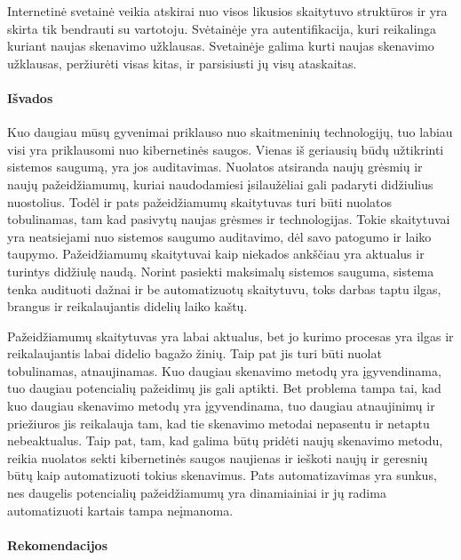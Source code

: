 Internetinė svetainė veikia atskirai nuo visos likusios skaitytuvo struktūros ir yra skirta tik bendrauti su vartotoju. Svėtainėje yra autentifikacija, kuri reikalinga kuriant naujas skenavimo užklausas. Svetainėje galima kurti naujas skenavimo užklausas, peržiurėti visas kitas, ir parsisiusti jų visų ataskaitas. 

\paragraph{Išvados}

Kuo daugiau mūsų gyvenimai priklauso nuo skaitmeninių technologijų, tuo labiau visi yra priklausomi nuo kibernetinės saugos. Vienas iš geriausių būdų užtikrinti sistemos saugumą, yra jos auditavimas. Nuolatos atsiranda naujų grėsmių ir naujų pažeidžiamumų, kuriai naudodamiesi įsilaužėliai gali padaryti didžiulius nuostolius. Todėl ir pats pažeidžiamumų skaitytuvas turi būti nuolatos tobulinamas, tam kad pasivytų naujas grėsmes ir technologijas. Tokie skaitytuvai yra neatsiejami nuo sistemos saugumo auditavimo, dėl savo patogumo ir laiko taupymo. Pažeidžiamumų skaitytuvai kaip niekados ankščiau yra aktualus ir turintys didžiulę naudą. Norint pasiekti maksimalų sistemos sauguma, sistema tenka audituoti dažnai ir be automatizuotų skaitytuvu, toks darbas taptu ilgas, brangus ir reikalaujantis didelių laiko kaštų.

Pažeidžiamumų skaitytuvas yra labai aktualus, bet jo kurimo procesas yra ilgas ir reikalaujantis labai didelio bagažo žinių. Taip pat jis turi būti nuolat tobulinamas, atnaujinamas. Kuo daugiau skenavimo metodų yra įgyvendinama, tuo daugiau potencialių pažeidimų jis gali aptikti. Bet problema tampa tai, kad kuo daugiau skenavimo metodų yra įgyvendinama, tuo daugiau atnaujinimų ir priežiuros jis reikalauja tam, kad tie skenavimo metodai nepasentu ir netaptu nebeaktualus. Taip pat, tam, kad galima būtų pridėti naujų skenavimo metodu, reikia nuolatos sekti kibernetinės saugos naujienas ir ieškoti naujų ir geresnių būtų kaip automatizuoti tokius skenavimus. Pats automatizavimas yra sunkus, nes daugelis potencialių pažeidžiamumų yra dinamiainiai ir jų radima automatizuoti kartais tampa neįmanoma. 

\paragraph{Rekomendacijos}

